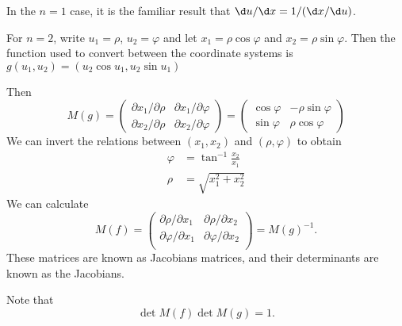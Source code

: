 \documentclass[a4paper]{article}
\begin{document}
In the $n = 1$ case, it is the familiar result that $\d u/\d x = 1/(\d x/\d u)$.

\begin{eg}
  For $n = 2$, write $u_1 = \rho$, $u_2 =\varphi$ and let $x_1 = \rho \cos \varphi$ and $x_2 = \rho \sin \varphi$. Then the function used to convert between the coordinate systems is $g(u_1, u_2) = (u_2\cos u_1, u_2\sin u_1)$

  Then
  \[
    M(g) =
    \begin{pmatrix}
      \partial x_1/\partial \rho & \partial x_1/\partial \varphi\\
      \partial x_2/\partial \rho & \partial x_2/\partial \varphi
    \end{pmatrix}
    =
    \begin{pmatrix}
      \cos\varphi & -\rho\sin \varphi\\
      \sin \varphi & \rho \cos \varphi
    \end{pmatrix}
  \]
  We can invert the relations between $(x_1, x_2)$ and $(\rho, \varphi)$ to obtain
  \begin{align*}
    \varphi &= \tan^{-1} \frac{x_2}{x_1}\\
    \rho &= \sqrt{x_1^2 + x_2^2}
  \end{align*}
  We can calculate
  \[
    M(f) =
    \begin{pmatrix}
      \partial\rho/\partial x_1 & \partial\rho/\partial x_2\\
      \partial\varphi/\partial x_1 & \partial\varphi/\partial x_2\\
    \end{pmatrix}
    = M(g)^{-1}.
  \]
  These matrices are known as Jacobians matrices, and their determinants are known as the Jacobians.
\end{eg}
Note that
\[
  \det M(f)\det M(g) = 1.
\]
\end{document}
